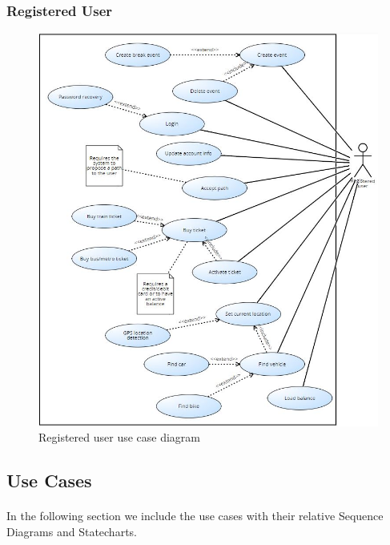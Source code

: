 \documentclass{article}
\begin{document}
\subsubsection{Registered User}
\begin{figure}[H]
\includegraphics[width=\linewidth]{Registered_user_use_case.jpg}
\caption{Registered user use case diagram}
\label{fig:UCD2}
\end{figure}
\newpage
\subsection{Use Cases}
\paragraph{}
In the following section we include the use cases with their relative Sequence Diagrams and Statecharts.\\
\end{document}
